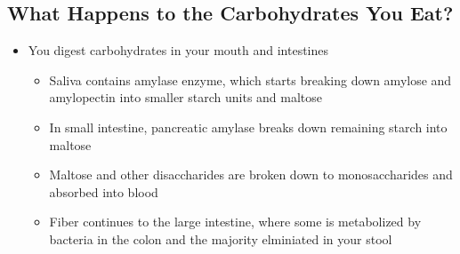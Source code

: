 \documentclass[12pt]{article}
\begin{document}
        \subsection{What Happens to the Carbohydrates You Eat?}
            \begin{itemize}
                \item You digest carbohydrates in your mouth and intestines
                    \begin{itemize}
                        \item Saliva contains amylase enzyme, which starts breaking down amylose and amylopectin into smaller starch units and maltose
                        \item In small intestine, pancreatic amylase breaks down remaining starch into maltose
                        \item Maltose and other disaccharides are broken down to monosaccharides and absorbed into blood
                        \item Fiber continues to the large intestine, where some is metabolized by bacteria in the colon and the majority elminiated in your stool
                    \end{itemize}
            \end{itemize}
\end{document}
